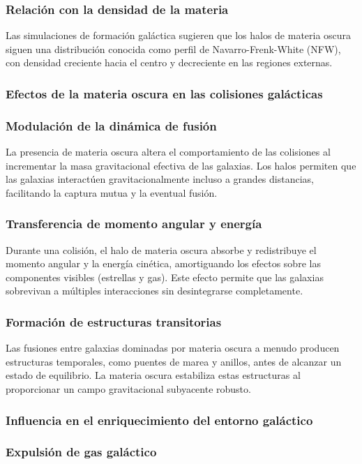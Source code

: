 \documentclass{article}
\begin{document}
\subsubsection*{Relación con la densidad de la materia}

Las simulaciones de formación galáctica sugieren que los halos de materia oscura siguen una distribución conocida como perfil de Navarro-Frenk-White (NFW), con densidad creciente hacia el centro y decreciente en las regiones externas.
\subsubsection{Efectos de la materia oscura en las colisiones galácticas}
\subsubsection*{Modulación de la dinámica de fusión}

La presencia de materia oscura altera el comportamiento de las colisiones al incrementar la masa gravitacional efectiva de las galaxias.
Los halos permiten que las galaxias interactúen gravitacionalmente incluso a grandes distancias, facilitando la captura mutua y la eventual fusión.
\subsubsection*{Transferencia de momento angular y energía}

Durante una colisión, el halo de materia oscura absorbe y redistribuye el momento angular y la energía cinética, amortiguando los efectos sobre las componentes visibles (estrellas y gas).
Este efecto permite que las galaxias sobrevivan a múltiples interacciones sin desintegrarse completamente.
\subsubsection*{Formación de estructuras transitorias}

Las fusiones entre galaxias dominadas por materia oscura a menudo producen estructuras temporales, como puentes de marea y anillos, antes de alcanzar un estado de equilibrio. La materia oscura estabiliza estas estructuras al proporcionar un campo gravitacional subyacente robusto.
\subsubsection{Influencia en el enriquecimiento del entorno galáctico}
\subsubsection*{Expulsión de gas galáctico}
\end{document}
